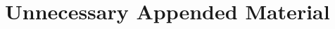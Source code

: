 \documentclass{kththesis}
\begin{document}















\printbibliography[heading=bibintoc] %

\appendix
\chapter{Unnecessary Appended Material}
\end{document}
